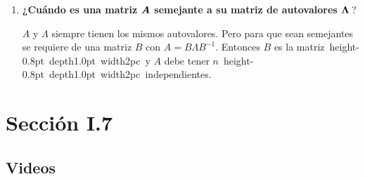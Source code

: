 \documentclass[12pt,a4paper]{article}
\newcommand{\bi}[1]{\hbox{\boldmath$#1$}}
\newcommand\1{\mbox{\,\vrule height-0.8pt depth1.0pt width2pc\,}}
\newcommand\2{\mbox{\,\vrule height-0.8pt depth1.0pt width1pc\,}}
\newcommand{\La}{\Lambda}
\begin{document}
\begin{enumerate}
\item \textbf{¿Cuándo es una matriz $\bi{A}$ semejante a su matriz de autovalores $\bi{\La}$}\,?

$A$ y $\La$ siempre tienen los mismos autovalores. Pero para que sean semejantes se requiere de una matriz $B$ con $A=B\La B^{-1}$. Entonces $B$ es la matriz \1 y $A$ debe tener $n$ \1 independientes.

\end{enumerate}

\section{Sección I.7}

\subsection*{Videos}
\end{document}
